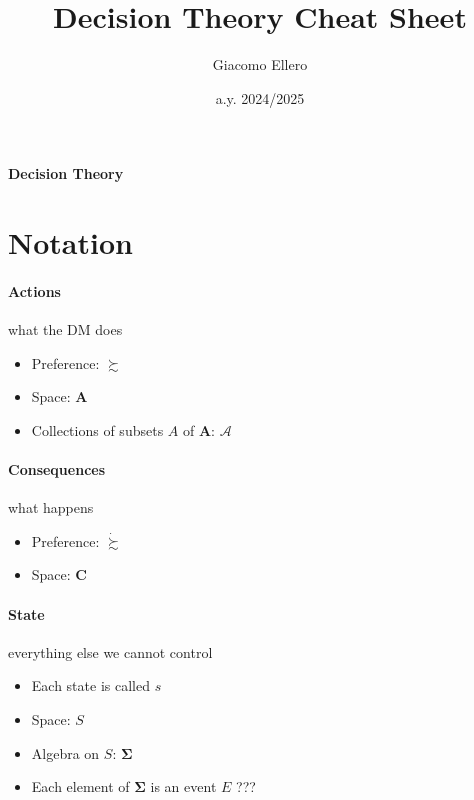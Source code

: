 \documentclass[14pt]{extarticle}
\title{Decision Theory Cheat Sheet}
\author{Giacomo Ellero}
\date{a.y. 2024/2025}
\begin{document}
\begin{center}
	\huge
	\bf
	Decision Theory
\end{center}

\setlength{\columnsep}{1cm}
\setlength{\columnseprule}{1pt}
\def\columnseprulecolor{\color{blue}}

\vspace{0.25cm}

\section{Notation}


\paragraph{Actions} what the DM does
\begin{itemize}
	\item Preference: $\succsim$
	\item Space: $\bm A$
	\item Collections of subsets $A$ of $\bm A$: $\mathcal A$
\end{itemize}


\paragraph{Consequences} what happens
\begin{itemize}
	\item Preference: $\dot \succsim$
	\item Space: $\bm C$
\end{itemize}


\paragraph{State} everything else we cannot control
\begin{itemize}
	\item Each state is called $s$
	\item Space: $S$
	\item Algebra on $S$: $\bm \Sigma$
	\item Each element of $\bm \Sigma$ is an event $E$ ???
\end{itemize}
\end{document}
